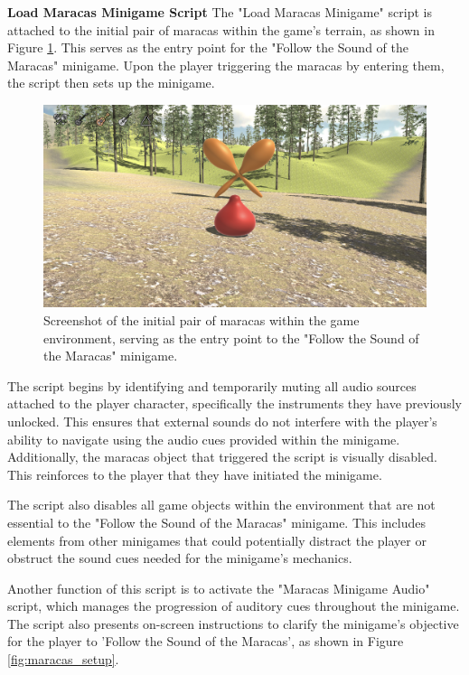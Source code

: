 \documentclass{l4proj}
\begin{document}
\textbf{Load Maracas Minigame Script} \newline
The "Load Maracas Minigame" script is attached to the initial pair of maracas within the game's terrain, as shown in Figure \ref{fig:maracas_trigger}. This serves as the entry point for the "Follow the Sound of the Maracas" minigame. Upon the player triggering the maracas by entering them, the script then sets up the minigame.

\begin{figure}[h]
 \centering
 \includegraphics[width=0.7\linewidth]{dissertation/images/Maracas_Trigger.png} 
 \caption{Screenshot of the initial pair of maracas within the game environment, serving as the entry point to the "Follow the Sound of the Maracas" minigame.} 
 \label{fig:maracas_trigger} 
\end{figure}

The script begins by identifying and temporarily muting all audio sources attached to the player character, specifically the instruments they have previously unlocked. This ensures that external sounds do not interfere with the player's ability to navigate using the audio cues provided within the minigame. Additionally, the maracas object that triggered the script is visually disabled. This  reinforces to the player that they have initiated the minigame.

The script also disables all game objects within the environment that are not essential to the "Follow the Sound of the Maracas" minigame. This includes elements from other minigames that could potentially distract the player or obstruct the sound cues needed for the minigame's mechanics.

Another function of this script is to activate the "Maracas Minigame Audio" script, which manages the progression of auditory cues throughout the minigame. The script also presents on-screen instructions to clarify the minigame's objective for the player to 'Follow the Sound of the Maracas', as shown in Figure \ref{fig:maracas_setup}.
\end{document}
